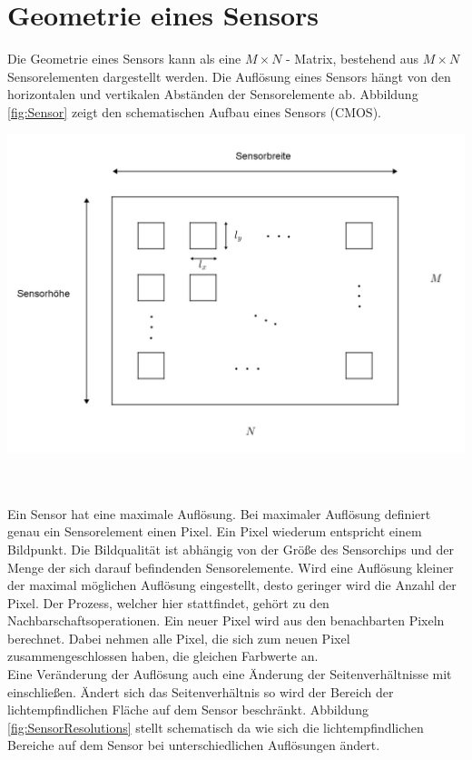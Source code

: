 \section{Geometrie eines Sensors}


Die Geometrie eines Sensors kann als eine  $M \times N$ - Matrix, bestehend aus $M \times N$ Sensorelementen dargestellt werden\cite{Photonik}. Die Auflösung eines Sensors hängt von den horizontalen und vertikalen Abständen der Sensorelemente ab. Abbildung \ref{fig:Sensor} zeigt den schematischen Aufbau eines Sensors (CMOS). 

\begin{minipage}{\linewidth}
	\centering
	\includegraphics[width=.8\linewidth]{images/Bildsensor_mit_Pixel.png}
	\label{fig:Sensor}
\end{minipage}\\ \\


Ein Sensor hat eine maximale Auflösung. Bei maximaler Auflösung definiert genau ein Sensorelement einen Pixel. Ein Pixel wiederum entspricht einem Bildpunkt\cite{Photonik}. Die Bildqualität ist abhängig von der Größe des Sensorchips und der Menge der sich darauf befindenden Sensorelemente. Wird eine Auflösung kleiner der maximal möglichen Auflösung eingestellt, desto geringer wird die Anzahl der Pixel. Der Prozess, welcher hier stattfindet, gehört zu den Nachbarschaftsoperationen\cite{Photonik}. Ein neuer Pixel wird aus den benachbarten Pixeln berechnet. Dabei nehmen alle Pixel, die sich zum neuen Pixel zusammengeschlossen haben, die gleichen Farbwerte an. \\

Eine Veränderung der Auflösung auch eine Änderung der Seitenverhältnisse mit einschließen. Ändert sich das Seitenverhältnis so wird der Bereich der lichtempfindlichen Fläche auf dem Sensor beschränkt\cite{Photonik}. Abbildung \ref{fig:SensorResolutions} stellt schematisch da wie sich die lichtempfindlichen Bereiche auf dem Sensor bei unterschiedlichen Auflösungen ändert.


